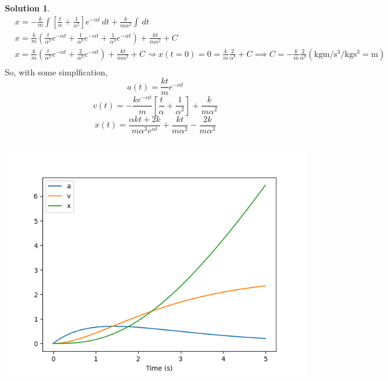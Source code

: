 \documentclass[10pt]{article}
\theoremstyle{definition}
\newtheorem{soln}{Solution}
\begin{document}
\begin{soln}
\begin{align*}
             & x=-\frac{k}{m}\int \left[\frac{t}{\alpha}+\frac{1}{\alpha^2}\right]e^{-\alpha t} \, dt+\frac{k}{m\alpha^2}\int\,dt                                                                                                                                                                                                  \\
             & x=\frac{k}{m}\left(\frac{t}{\alpha^2}e^{-\alpha t}+\frac{1}{\alpha^3}e^{-\alpha t}+\frac{1}{\alpha^3}e^{-\alpha t}\right)+\frac{kt}{m\alpha^2} + C                                                                                                                                                                  \\
             & x=\frac{k}{m}\left(\frac{t}{\alpha^2}e^{-\alpha t}+\frac{2}{\alpha^3}e^{-\alpha t}\right)+\frac{kt}{m\alpha^2} + C \rightsquigarrow x(t=0)=0=\frac{k}{m}\frac{2}{\alpha^3}+C\implies C=-\frac{k}{m}\frac{2}{\alpha^3}\left(\unit{\kilo\gram\meter\per\second\cubed\per\kilo\gram\second\cubed}=\unit{\meter}\right) \\
      \end{align*}
      So, with some simplfication,
      $$a(t)=\frac{kt}{m}e^{-\alpha t}$$
      $$v(t)=-\frac{ke^{-\alpha t}}{m}\left[\frac{t}{\alpha}+\frac{1}{\alpha^2}\right]+\frac{k}{m\alpha^2}$$
      $$x(t)=\frac{\alpha k t +2k}{m\alpha^3e^{\alpha t}}+\frac{kt}{m\alpha^2}-\frac{2k}{m\alpha^3}$$
      \newpage
      \inputminted[breaklines, autogobble]{python3}{q3.py}
      \begin{center}
            \includegraphics[scale=0.75]{Figure_1.png}
      \end{center}
\end{soln}
\end{document}
